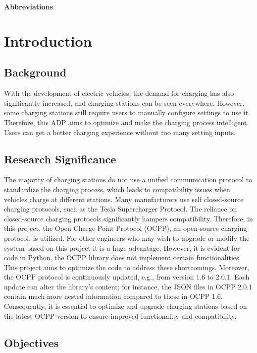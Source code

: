 \documentclass[
english,
ruledheaders=section,%
class=report,%
thesis={type=Report},%
accentcolor=9c,%
custommargins=true,%
marginpar=false,%
parskip=half-,%
fontsize=11pt,%
logofile={img/tuda_logo.pdf}, %
]{tudapub}
\begin{document}
    \tableofcontents

    \clearpage
    \textbf{Abbreviations}
    
    \listoffigures
    \listoftables


    \chapter{Introduction}

    \section{Background}
    With the development of electric vehicles, the demand for charging has also significantly increased, and charging stations can be seen everywhere. However, some charging stations still require users to manually configure settings to use it. Therefore, this ADP aims to optimize and make the charging process intelligent. Users can get a better charging experience without too many setting inputs.
    \section{Research Significance}

    The majority of charging stations do not use a unified communication protocol to standardize the charging process, which leads to compatibility issues when vehicles charge at different stations. Many manufacturers use self closed-source charging protocols, such as the Tesla Supercharger Protocol. The reliance on closed-source charging protocols significantly hampers compatibility. Therefore, in this project, the Open Charge Point Protocol (OCPP), an open-source charging protocol, is utilized. For other engineers who may wish to upgrade or modify the system based on this project it is a huge advantage. However, it is evident for code in Python, the OCPP library does not implement certain functionalities. This project aims to optimize the code to address these shortcomings. Moreover, the OCPP protocol is continuously updated, e.g., from version 1.6 to 2.0.1. Each update can alter the library's content; for instance, the JSON files in OCPP 2.0.1 contain much more nested information compared to those in OCPP 1.6. Consequently, it is essential to optimize and upgrade charging stations based on the latest OCPP version to ensure improved functionality and compatibility.

    \section{Objectives}
\end{document}
